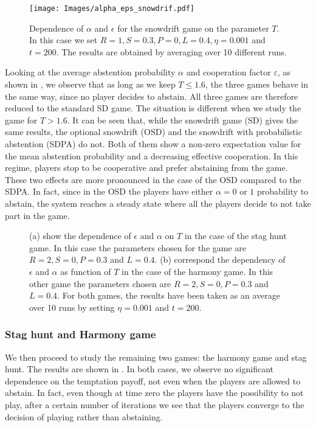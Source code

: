 \documentclass[12pt,oneside,a4paper,fleqn]{article}
\begin{document}
\begin{figure}
    \centering
    \texttt{[image: Images/alpha\_eps\_snowdrif.pdf]}
    \caption{Dependence of $\alpha$ and $\epsilon$ for the snowdrift game on the parameter $T$. In this case we set $R = 1, S = 0.3, P = 0, L = 0.4, \eta = 0.001$ and $t = 200$. The results are obtained by averaging over 10 different runs.}
    \label{fig: epsilon and alpha snodrift}
\end{figure}

Looking at the average abstention probability $\alpha$ and cooperation factor $\varepsilon$, as shown in , we observe that as long as we keep $T \leq 1.6$, the three games behave in the same way, since no player decides to abstain. All three games are therefore reduced to the standard SD game. The situation is different when we study the game for $T > 1.6$. It can be seen that, while the snowdrift game (SD) gives the same results, the optional snowdrift (OSD) and the snowdrift with probabilistic abstention (SDPA) do not.
Both of them show a non-zero expectation value for the mean abstention probability and a decreasing effective cooperation. In this regime, players stop to be cooperative and prefer  abstaining from the game.
These two effects are more pronounced in the case of the OSD compared to the SDPA.
In fact, since in the OSD the players have either $\alpha = 0$ or $1$ probability to abstain, the system reaches a steady state where all the players decide to not take part in the game.

\begin{figure}
    \centering
    \caption{(a) show the dependence of $\epsilon$ and $\alpha$ on $T$ in the case of the stag hunt game. In this case the parameters chosen for the game are $R = 2, S = 0, P = 0.3$ and $L = 0.4$. (b) correspond the dependency of $\epsilon$ and $\alpha$ as function of $T$ in the case of the harmony game. In this other game the parameters chosen are $R = 2, S = 0, P = 0.3$ and $L = 0.4$. For both games, the results have been taken as an average over 10 runs by setting $\eta = 0.001$ and $t = 200$.}
    \label{fig: harmony game and stag hunt}
\end{figure}
\subsubsection{Stag hunt and Harmony game}
We then proceed to study the remaining two games: the harmony game and stag hunt. The results are shown in . In both cases, we observe no significant dependence on the temptation payoff, not even when the players are allowed to abstain.
In fact, even though at time zero the players have the possibility to not play, after a certain number of iterations we see that the players converge to the decision of playing rather than abstaining.
\end{document}
